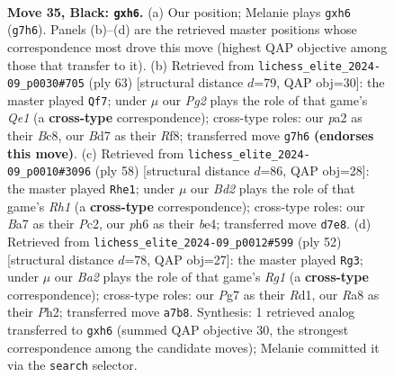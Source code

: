 \documentclass[11pt]{article}
\begin{document}
\clearpage

\begin{figure}[p]\centering
\begin{subfigure}{0.46\textwidth}\centering
\resizebox{\linewidth}{!}{%
\newchessgame
\chessboard[
  setfen={r2r3k/bp1b1Qp1/p3p2P/8/6q1/BP1p4/P4P1P/1R2RK2 b - - 1 35},
  showmover=false,
  pgfstyle=straightmove, color=movearrow, markmove={g7-h6}
]}
\caption{}
\end{subfigure}\hfill
\begin{subfigure}{0.46\textwidth}\centering
\resizebox{\linewidth}{!}{%
\newchessgame
\chessboard[
  setfen={r1bkqr2/pp6/3P1p1Q/1p1P1P2/8/P7/1P6/2K1R2R b - - 1 32},
  showmover=false,
  pgfstyle=straightmove, color=movearrow, markmove={e8-f7}
]}
\caption{}
\end{subfigure}
\\[4pt]
\begin{subfigure}{0.46\textwidth}\centering
\resizebox{\linewidth}{!}{%
\newchessgame
\chessboard[
  setfen={r3r1k1/5p1p/p2p1Q2/1p6/4b3/P3qP2/1PP3PP/K2R3R w - - 0 30},
  showmover=false,
  pgfstyle=straightmove, color=movearrow, markmove={h1-e1}
]}
\caption{}
\end{subfigure}\hfill
\begin{subfigure}{0.46\textwidth}\centering
\resizebox{\linewidth}{!}{%
\newchessgame
\chessboard[
  setfen={1rr4k/6p1/3p2P1/p2Bpp1q/3n4/3Q4/PpP4P/1K1R2R1 w - - 2 27},
  showmover=false,
  pgfstyle=straightmove, color=movearrow, markmove={g1-g3}
]}
\caption{}
\end{subfigure}
\caption{\textbf{Move 35, Black: \texttt{gxh6}.} (a) Our position; Melanie plays \texttt{gxh6} (\texttt{g7h6}). Panels (b)--(d) are the retrieved master positions whose correspondence most drove this move (highest QAP objective among those that transfer to it). (b) Retrieved from \texttt{lichess\_elite\_2024-09\_p0030\#705} (ply 63) [structural distance $d$=79, QAP obj=30]: the master played \texttt{Qf7}; under $\mu$ our \emph{Pg2} plays the role of that game's \emph{Qe1} (a \textbf{cross-type} correspondence); cross-type roles: our \emph{p}a2 as their \emph{B}c8, our \emph{B}d7 as their \emph{R}f8; transferred move \texttt{g7h6} \textbf{(endorses this move)}. (c) Retrieved from \texttt{lichess\_elite\_2024-09\_p0010\#3096} (ply 58) [structural distance $d$=86, QAP obj=28]: the master played \texttt{Rhe1}; under $\mu$ our \emph{Bd2} plays the role of that game's \emph{Rh1} (a \textbf{cross-type} correspondence); cross-type roles: our \emph{B}a7 as their \emph{P}c2, our \emph{p}h6 as their \emph{b}e4; transferred move \texttt{d7e8}. (d) Retrieved from \texttt{lichess\_elite\_2024-09\_p0012\#599} (ply 52) [structural distance $d$=78, QAP obj=27]: the master played \texttt{Rg3}; under $\mu$ our \emph{Ba2} plays the role of that game's \emph{Rg1} (a \textbf{cross-type} correspondence); cross-type roles: our \emph{P}g7 as their \emph{R}d1, our \emph{R}a8 as their \emph{P}h2; transferred move \texttt{a7b8}. Synthesis: 1 retrieved analog transferred to \texttt{gxh6} (summed QAP objective 30, the strongest correspondence among the candidate moves); Melanie committed it via the \texttt{search} selector.}
\label{fig:thought-m69}
\end{figure}
\end{document}
